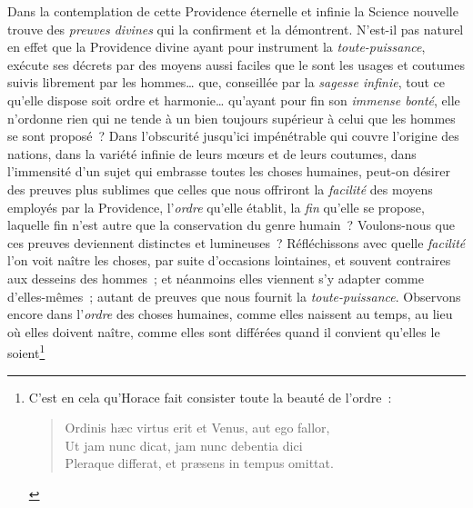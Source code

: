 \documentclass[french,twoside]{book} %
\begin{document}
Dans la contemplation de cette Providence éternelle et infinie la Science nouvelle trouve des {\itshape preuves divines} qui la confirment et la démontrent. N’est-il pas naturel en effet que la Providence divine ayant pour instrument la {\itshape toute-puissance}, exécute ses décrets par des moyens aussi faciles que le sont les usages et coutumes suivis librement par les hommes… que, conseillée par la {\itshape sagesse infinie}, tout ce qu’elle dispose soit ordre et harmonie… qu’ayant pour fin son {\itshape immense bonté}, elle n’ordonne rien qui ne tende à un bien toujours supérieur à celui que les hommes se sont proposé ? Dans l’obscurité jusqu’ici impénétrable qui couvre l’origine des nations, dans la variété infinie de leurs mœurs et de leurs coutumes, dans l’immensité d’un sujet qui embrasse toutes les choses humaines, peut-on désirer des preuves plus sublimes que celles que nous offriront la {\itshape facilité} des moyens employés par la Providence, l’{\itshape ordre} qu’elle établit, la {\itshape fin} qu’elle se propose, laquelle fin n’est autre que la conservation du genre humain ? Voulons-nous que ces preuves deviennent distinctes et lumineuses ? Réfléchissons avec quelle {\itshape facilité} l’on voit naître les choses, par suite d’occasions lointaines, et  souvent contraires aux desseins des hommes ; et néanmoins elles viennent s’y adapter comme d’elles-mêmes ; autant de preuves que nous fournit la {\itshape toute-puissance}. Observons encore dans l’{\itshape ordre} des choses humaines, comme elles naissent au temps, au lieu où elles doivent naître, comme elles sont différées quand il convient qu’elles le soient\footnote{\noindent C’est en cela qu’Horace fait consister toute la beauté de l’ordre :\par

\begin{verse}
Ordinis hæc virtus erit et Venus, aut ego fallor,\\
Ut jam nunc dicat, jam nunc debentia dici\\
Pleraque differat, et præsens in tempus omittat.\\
\end{verse}

}
\end{document}
